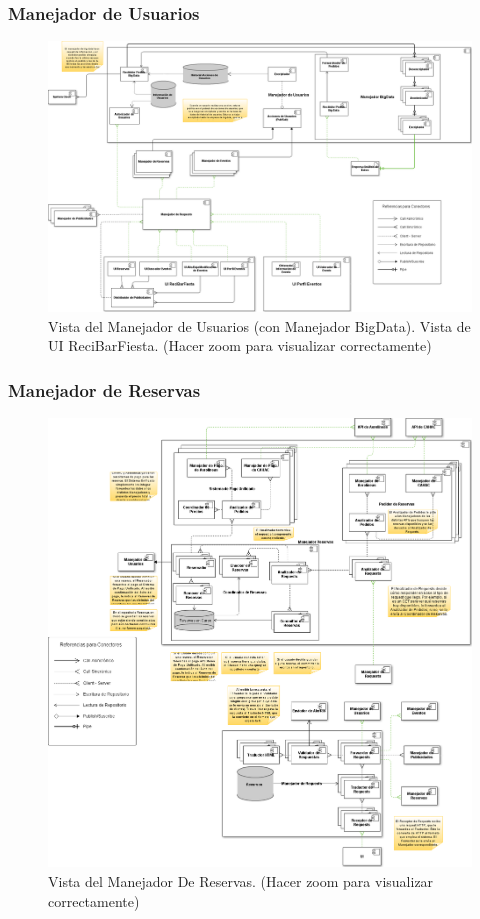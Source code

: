 \subsubsection{Manejador de Usuarios}

\begin{figure}[H]
  \centering
  \includegraphics[width=\textwidth]{diagramas/ManejadorDeUsuarios.png}
  \caption{\normalfont Vista del Manejador de Usuarios (con Manejador BigData). Vista de UI ReciBarFiesta. (Hacer zoom para visualizar correctamente)}
\end{figure} 

\subsubsection{Manejador de Reservas}

\begin{figure}[H]
  \centering
  \includegraphics[width=\textwidth]{diagramas/ManejadorReservas.png}
  \caption{\normalfont Vista del Manejador De Reservas. (Hacer zoom para visualizar correctamente)}
\end{figure} 

